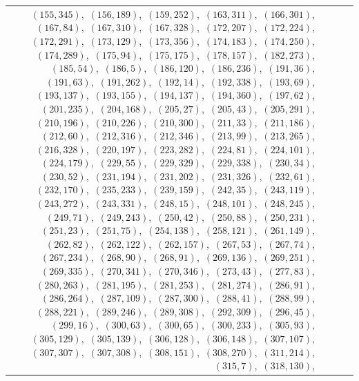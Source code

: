 \documentclass[11pt]{article}
\begin{document}
{\begin{longtable}{@{}rrl>{\raggedright\arraybackslash}p{}@{}}
$(155,345)$,\allowbreak\ $(156,189)$,\allowbreak\ $(159,252)$,\allowbreak\ $(163,311)$,\allowbreak\ $(166,301)$,\allowbreak\ $(167,84)$,\allowbreak\ $(167,310)$,\allowbreak\ $(167,328)$,\allowbreak\ $(172,207)$,\allowbreak\ $(172,224)$,\allowbreak\ $(172,291)$,\allowbreak\ $(173,129)$,\allowbreak\ $(173,356)$,\allowbreak\ $(174,183)$,\allowbreak\ $(174,250)$,\allowbreak\ $(174,289)$,\allowbreak\ $(175,94)$,\allowbreak\ $(175,175)$,\allowbreak\ $(178,157)$,\allowbreak\ $(182,273)$,\allowbreak\ $(185,54)$,\allowbreak\ $(186,5)$,\allowbreak\ $(186,120)$,\allowbreak\ $(186,236)$,\allowbreak\ $(191,36)$,\allowbreak\ $(191,63)$,\allowbreak\ $(191,262)$,\allowbreak\ $(192,14)$,\allowbreak\ $(192,338)$,\allowbreak\ $(193,69)$,\allowbreak\ $(193,137)$,\allowbreak\ $(193,155)$,\allowbreak\ $(194,137)$,\allowbreak\ $(194,360)$,\allowbreak\ $(197,62)$,\allowbreak\ $(201,235)$,\allowbreak\ $(204,168)$,\allowbreak\ $(205,27)$,\allowbreak\ $(205,43)$,\allowbreak\ $(205,291)$,\allowbreak\ $(210,196)$,\allowbreak\ $(210,226)$,\allowbreak\ $(210,300)$,\allowbreak\ $(211,33)$,\allowbreak\ $(211,186)$,\allowbreak\ $(212,60)$,\allowbreak\ $(212,316)$,\allowbreak\ $(212,346)$,\allowbreak\ $(213,99)$,\allowbreak\ $(213,265)$,\allowbreak\ $(216,328)$,\allowbreak\ $(220,197)$,\allowbreak\ $(223,282)$,\allowbreak\ $(224,81)$,\allowbreak\ $(224,101)$,\allowbreak\ $(224,179)$,\allowbreak\ $(229,55)$,\allowbreak\ $(229,329)$,\allowbreak\ $(229,338)$,\allowbreak\ $(230,34)$,\allowbreak\ $(230,52)$,\allowbreak\ $(231,194)$,\allowbreak\ $(231,202)$,\allowbreak\ $(231,326)$,\allowbreak\ $(232,61)$,\allowbreak\ $(232,170)$,\allowbreak\ $(235,233)$,\allowbreak\ $(239,159)$,\allowbreak\ $(242,35)$,\allowbreak\ $(243,119)$,\allowbreak\ $(243,272)$,\allowbreak\ $(243,331)$,\allowbreak\ $(248,15)$,\allowbreak\ $(248,101)$,\allowbreak\ $(248,245)$,\allowbreak\ $(249,71)$,\allowbreak\ $(249,243)$,\allowbreak\ $(250,42)$,\allowbreak\ $(250,88)$,\allowbreak\ $(250,231)$,\allowbreak\ $(251,23)$,\allowbreak\ $(251,75)$,\allowbreak\ $(254,138)$,\allowbreak\ $(258,121)$,\allowbreak\ $(261,149)$,\allowbreak\ $(262,82)$,\allowbreak\ $(262,122)$,\allowbreak\ $(262,157)$,\allowbreak\ $(267,53)$,\allowbreak\ $(267,74)$,\allowbreak\ $(267,234)$,\allowbreak\ $(268,90)$,\allowbreak\ $(268,91)$,\allowbreak\ $(269,136)$,\allowbreak\ $(269,251)$,\allowbreak\ $(269,335)$,\allowbreak\ $(270,341)$,\allowbreak\ $(270,346)$,\allowbreak\ $(273,43)$,\allowbreak\ $(277,83)$,\allowbreak\ $(280,263)$,\allowbreak\ $(281,195)$,\allowbreak\ $(281,253)$,\allowbreak\ $(281,274)$,\allowbreak\ $(286,91)$,\allowbreak\ $(286,264)$,\allowbreak\ $(287,109)$,\allowbreak\ $(287,300)$,\allowbreak\ $(288,41)$,\allowbreak\ $(288,99)$,\allowbreak\ $(288,221)$,\allowbreak\ $(289,246)$,\allowbreak\ $(289,308)$,\allowbreak\ $(292,309)$,\allowbreak\ $(296,45)$,\allowbreak\ $(299,16)$,\allowbreak\ $(300,63)$,\allowbreak\ $(300,65)$,\allowbreak\ $(300,233)$,\allowbreak\ $(305,93)$,\allowbreak\ $(305,129)$,\allowbreak\ $(305,139)$,\allowbreak\ $(306,128)$,\allowbreak\ $(306,148)$,\allowbreak\ $(307,107)$,\allowbreak\ $(307,307)$,\allowbreak\ $(307,308)$,\allowbreak\ $(308,151)$,\allowbreak\ $(308,270)$,\allowbreak\ $(311,214)$,\allowbreak\ $(315,7)$,\allowbreak\ $(318,130)$,\allowbreak\ 
\end{longtable}}
\end{document}
